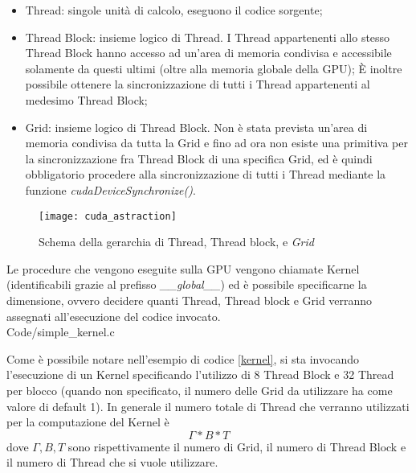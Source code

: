 \begin{itemize}
    \item
        Thread: singole unità di calcolo, eseguono il codice sorgente;
    \item
        Thread Block: insieme logico di Thread.
        I Thread appartenenti
        allo stesso Thread Block hanno accesso ad un'area di memoria
        condivisa e accessibile solamente da questi ultimi
        (oltre alla memoria globale della GPU);
        È inoltre possibile ottenere la sincronizzazione di tutti i
        Thread appartenenti al medesimo Thread Block;
    \item
        Grid: insieme logico di Thread Block. Non è stata
        prevista un'area di memoria condivisa da tutta la Grid
        e fino ad ora non esiste una primitiva per la sincronizzazione fra
        Thread Block di una specifica Grid, ed è quindi
        obbligatorio procedere alla sincronizzazione di tutti i Thread
        mediante la funzione \textit{cudaDeviceSynchronize()}.
\end{itemize}

\begin{figure}[H]
    \centering
    \texttt{[image: cuda\_astraction]}
    \caption{Schema della gerarchia di Thread, Thread block, e
        \textit{Grid} \cite[p.~59]{nickolls2010gpu}}
\end{figure}

Le procedure che vengono eseguite sulla GPU vengono chiamate Kernel
(identificabili grazie al prefisso \textit{\_\_global\_\_})
ed è possibile specificarne la dimensione, ovvero decidere quanti
Thread, Thread block e Grid verranno assegnati
all'esecuzione del codice invocato.
\\

    {Code/simple_kernel.c}

Come è possibile notare nell'esempio di codice \ref{kernel}, si sta invocando
l'esecuzione di un Kernel specificando l'utilizzo di 8 Thread Block e
32 Thread per blocco (quando non specificato, il numero delle
Grid da utilizzare ha come valore di default 1). In generale il numero totale di
Thread che verranno utilizzati per la computazione del Kernel è
$$\Gamma * B * T$$ dove $\Gamma, B, T$
sono rispettivamente
il numero di Grid, il numero di Thread Block e il numero
di Thread che si vuole utilizzare.

